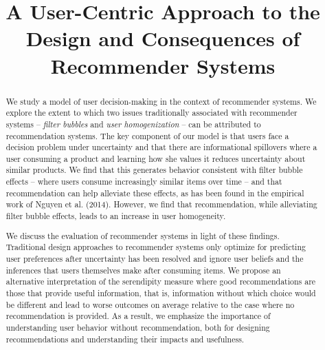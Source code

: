 \documentclass[sigconf]{acmart}
\begin{document}

%
\title{A User-Centric Approach to the Design and Consequences of Recommender Systems}
%

\makeatletter
\def\-copyrightspace{\relax}
\makeatother

%
\begin{abstract}
We study a model of user decision-making in the context of recommender systems. We explore the extent to which two issues traditionally associated with recommender systems -- \textit{filter bubbles} and \textit{user homogenization} -- can be attributed to recommendation systems. The key component of our model is that users face a decision problem under uncertainty and that there are informational spillovers where a user consuming a product and learning how she values it reduces uncertainty about similar products. We find that this generates behavior consistent with filter bubble effects -- where users consume increasingly similar items over time -- and that recommendation can help alleviate these effects, as has been found in the empirical work of Nguyen et al. (2014). However, we find that recommendation, while alleviating filter bubble effects, leads to an increase in user homogeneity.
\par
We discuss the evaluation of recommender systems in light of these findings. Traditional design approaches to recommender systems only optimize for predicting user preferences after uncertainty has been resolved and ignore user beliefs and the inferences that users themselves make after consuming items. We propose an alternative interpretation of the serendipity measure where good recommendations are those that provide useful information, that is, information without which choice would be different and lead to worse outcomes on average relative to the case where no recommendation is provided. As a result, we emphasize the importance of understanding user behavior without recommendation, both for designing recommendations and understanding their impacts and usefulness.
\end{abstract}
\end{document}
